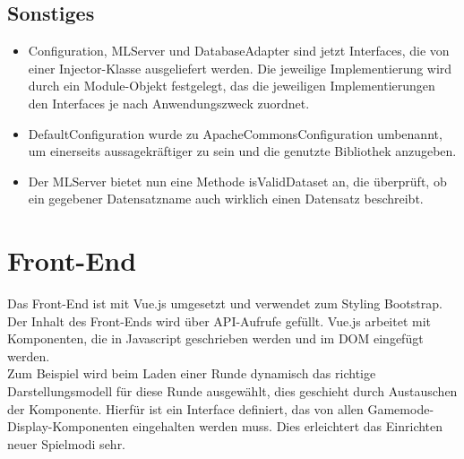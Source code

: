 \documentclass[a4paper]{scrreprt}
\begin{document}
\section{Sonstiges}
\begin{itemize}
    \item Configuration, MLServer und DatabaseAdapter sind jetzt Interfaces, die von einer Injector-Klasse ausgeliefert werden.
    Die jeweilige Implementierung wird durch ein Module-Objekt festgelegt, das die jeweiligen Implementierungen den Interfaces je nach Anwendungszweck zuordnet.
    \item DefaultConfiguration wurde zu ApacheCommonsConfiguration umbenannt, um einerseits aussagekräftiger zu sein und die genutzte Bibliothek anzugeben.
    \item Der MLServer bietet nun eine Methode isValidDataset an, die überprüft, ob ein gegebener Datensatzname auch wirklich einen Datensatz beschreibt.
\end{itemize}

\chapter{Front-End}
Das Front-End ist mit Vue.js umgesetzt und verwendet zum Styling Bootstrap. Der Inhalt des Front-Ends wird über API-Aufrufe gefüllt.
Vue.js arbeitet mit Komponenten, die in Javascript geschrieben werden und im DOM eingefügt werden. \\
Zum Beispiel wird beim Laden einer Runde dynamisch das richtige Darstellungsmodell für diese Runde ausgewählt, dies geschieht durch Austauschen der Komponente. Hierfür ist ein Interface definiert, das von allen Gamemode-Display-Komponenten eingehalten werden muss. Dies erleichtert das Einrichten neuer Spielmodi sehr.
\end{document}
